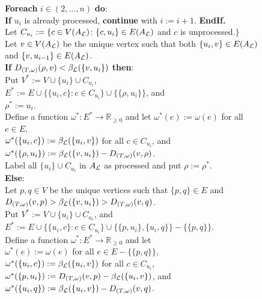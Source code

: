 \begin{figure}
{\begin{tabbing}
 \> \textbf{Foreach} $i \in (2,\dotsc,n)$ \textbf{do}:\\
 \> \> \textbf{If} $u_i$ is already processed, \textbf{continue}
                 with $i := i+1$.  \textbf{EndIf.}\\
 \> \> Let $C_{u_i} := \{c \in V(A_{{\mathcal L}}) \colon \{c,u_i\} \in E(A_{{\mathcal L}})$ and $c$
                 is unprocessed.$\}$\\
 \> \> Let $v \in V(A_{{\mathcal L}})$ be the unique vertex such that both $\{u_i,v\}
                 \in E(A_{{\mathcal L}})$\\
            \> \> \> and $\{v,u_{i-1}\} \in E(A_{{\mathcal L}})$.\\
 \> \> \textbf{If} $D_{(T,\omega)}(\rho,v) < \beta_{{\mathcal L}}(\{v,u_i\})$
                 \textbf{then}:\\
 \> \> \> Put $V^* := V \cup \{u_i\} \cup C_{u_i}$,\\
           \> \> \> \> $E^* := E \cup \{\{u_i,c\} \colon c \in C_{u_i}\} \cup
                       \{\{\rho,u_i\}\}$, and\\
           \> \> \> \> $\rho^* := u_i$.\\
 \> \> \> Define a function $\omega^* \colon E^* \to
                    \mathbb{R}_{\geq 0}$ and let $\omega^*(e) := \omega(e)$
                    for all $e \in E$,\\
           \> \> \> \> $\omega^*(\{u_i,c\}) := \beta_{{\mathcal L}}(\{u_i,v\})$ for all $c
                       \in C_{u_i}$, and\\
           \> \> \> \> $\omega^*(\{\rho,u_i\}) := \beta_{{\mathcal L}}(\{v,u_i\}) -
                       D_{(T,\omega)}(v,\rho)$.\\

 \> \> \> Label all $\{u_i\} \cup C_{u_i}$ in $A_{{\mathcal L}}$ as processed and put
                    $\rho := \rho^*$.\\

 \> \> \textbf{Else}:\\
 \> \> \> Let $p,q \in V$ be the unique vertices such that $\{p,q\}
                    \in E$ and\\
           \> \> \> \> $D_{(T,\omega)}(v,p) > \beta_{{\mathcal L}}(\{v,u_i\}) > D_{(T,\omega)}(v,q)$.\\
           \> \> \> Put $V^*:= V \cup \{u_i\} \cup C_{u_i}$, and\\
           \> \> \> \>  $E^*:= E \cup \{\{u_i,c\} \colon c \in C_{u_i}\} \cup
                        \{\{p,u_i\},\{u_i,q\}\} - \{\{p,q\}\}$.\\
 \> \> \> Define a function $\omega^* \colon E^* \to
                    \mathbb{R}_{\geq 0}$ and let\\
           \> \> \> \> $\omega^*(e) := \omega(e)$ for all $e \in E - \{\{p,q\}\}$,\\
           \> \> \> \> $\omega^*(\{u_i,c\}) := \beta_{{\mathcal L}}(\{u_i,v\})$ for all $c \in
                       C_{u_i}$,\\
           \> \> \> \> $\omega^*(\{p,u_i\}):= D_{(T,\omega)}(v,p) - \beta_{{\mathcal L}}(\{u_i,v\})$, and\\
           \> \> \> \> $\omega^*(\{u_i,q\}):= \beta_{{\mathcal L}}(\{u_i,v\}) - D_{(T,\omega)}(v,q)$.\\


\end{tabbing}}
\end{figure}
